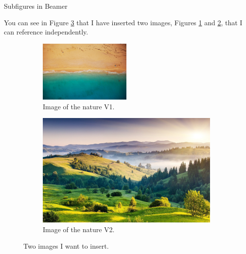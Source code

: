 \documentclass{beamer}
\begin{document}
\begin{frame}{Subfigures in Beamer}

You can see in Figure \ref{fig:images} that I have inserted two images, Figures \ref{fig:nature1} and \ref{fig:nature2}, that I can reference independently.

\begin{figure}
\centering
  \begin{subfigure}[t]{0.4\textwidth}
    \includegraphics[width=0.5\textwidth]{nature2.jpg}
    \caption{Image of the nature V1.}
    \label{fig:nature1}
  \end{subfigure}
  \begin{subfigure}[b]{0.4\textwidth}
    \includegraphics[width=\textwidth]{nature1.jpg}
    \caption{Image of the nature V2.}
    \label{fig:nature2}
  \end{subfigure}
\caption{Two images I want to insert.}
\label{fig:images}
\end{figure}

\end{frame}
\end{document}
